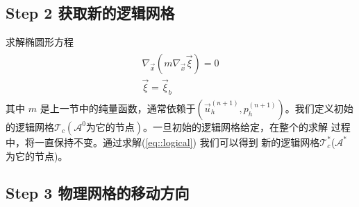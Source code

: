    \subsection{Step 2 获取新的逻辑网格}
     求解椭圆形方程
     \begin{eqnarray}
       \begin{aligned}
         \nabla_{\vec{x}} \left ( m \nabla_{\vec{x}} \vec{\xi} \right)
         = 0 \\
         \vec{\xi} = \vec{\xi}_b
       \end{aligned}
       \label{eq::logical}
     \end{eqnarray}
     其中 $m$ 是上一节中的纯量函数，通常依赖于$(\vec{u}_h^{(n + 1)},
     p_h^{(n + 1)})$。我们定义初始的逻辑网格$\mathcal{T}_c (\mathcal
     {A}^{0} \text{为它的节点})$。一旦初始的逻辑网格给定，在整个的求解
     过程中，将一直保持不变。通过求解(\ref{eq::logical}) 我们可以得到
     新的逻辑网格$\mathcal{T}_c^*$($\mathcal{A}^*$为它的节点)。
  \subsection{Step 3 物理网格的移动方向}

